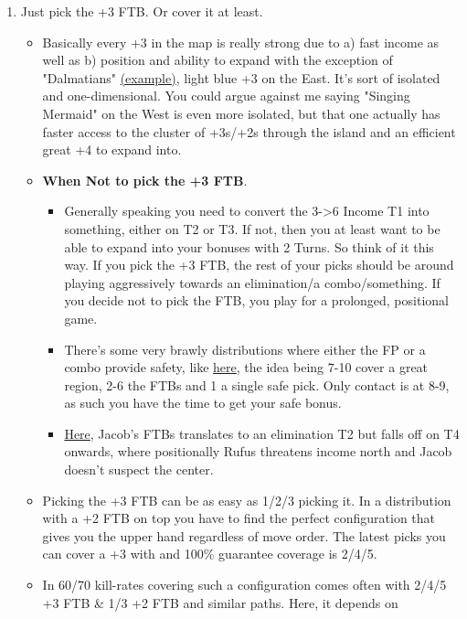 \begin{enumerate}
    \item Just pick the +3 FTB. Or cover it at least. 
    \begin{itemize}
        \item Basically every +3 in the map is really strong due to a) fast income as well as b) position and ability to expand with the exception of "Dalmatians" \href{https://www.warzone.com/MultiPlayer?GameID=41769963}{(example)}, light blue +3 on the East. It's sort of isolated and one-dimensional. You could argue against me saying "Singing Mermaid" on the West is even more isolated, but that one actually has faster access to the cluster of +3s/+2s through the island and an efficient great +4 to expand into.
        \item \textbf{When Not to pick the +3 FTB}. 
        \begin{itemize}
            \item Generally speaking you need to convert the 3->6 Income T1 into something, either on T2 or T3. If not, then you at least want to be able to expand into your bonuses with 2 Turns. So think of it this way. If you pick the +3 FTB, the rest of your picks should be around playing aggressively towards an elimination/a combo/something. If you decide not to pick the FTB, you play for a prolonged, positional game.
            \item There's some very brawly distributions where either the FP or a combo provide safety, like \href{https://www.warzone.com/MultiPlayer?GameID=35897078}{here}, the idea being 7-10 cover a great region, 2-6 the FTBs and 1 a single safe pick. Only contact is at 8-9, as such you have the time to get your safe bonus. 
            \item \href{https://www.warzone.com/MultiPlayer?GameID=39659780}{Here}, Jacob's FTBs translates to an elimination T2 but falls off on T4 onwards, where positionally Rufus threatens income north and Jacob doesn't suspect the center.
        \end{itemize} 
        \item Picking the +3 FTB can be as easy as 1/2/3 picking it. In a distribution with a +2 FTB on top you have to find the perfect configuration that gives you the upper hand regardless of move order. The latest picks you can cover a +3 with and 100\% guarantee coverage is 2/4/5. 
        \item In 60/70 kill-rates covering such a configuration comes often with 2/4/5 +3 FTB \& 1/3 +2 FTB and similar paths. Here, it depends on 

\end{itemize}
\end{enumerate}
